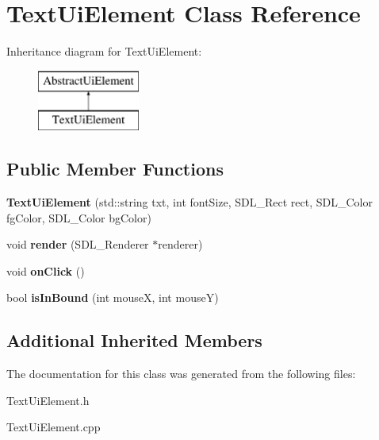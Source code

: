 \hypertarget{class_text_ui_element}{}\section{Text\+Ui\+Element Class Reference}
\label{class_text_ui_element}
Inheritance diagram for Text\+Ui\+Element\+:\begin{figure}[H]
\begin{center}
\leavevmode
\includegraphics[height=2.000000cm]{class_text_ui_element}
\end{center}
\end{figure}
\subsection*{Public Member Functions}
\begin{DoxyCompactItemize}
\item 
\mbox{\label{class_text_ui_element_a9386fa02eac98da9c8f71b6e2b2a88fb}} 
{\bfseries Text\+Ui\+Element} (std\+::string txt, int font\+Size, S\+D\+L\+\_\+\+Rect rect, S\+D\+L\+\_\+\+Color fg\+Color, S\+D\+L\+\_\+\+Color bg\+Color)
\item 
\mbox{\label{class_text_ui_element_a7931ba283acdf102442a9181b3ddf276}} 
void {\bfseries render} (S\+D\+L\+\_\+\+Renderer $\ast$renderer)
\item 
\mbox{\label{class_text_ui_element_a984d8bcd627f43c1bd858a707df2c042}} 
void {\bfseries on\+Click} ()
\item 
\mbox{\label{class_text_ui_element_aaf04a9d0a67e77e2ba2a306e1ec7aeed}} 
bool {\bfseries is\+In\+Bound} (int mouseX, int mouseY)
\end{DoxyCompactItemize}
\subsection*{Additional Inherited Members}


The documentation for this class was generated from the following files\+:\begin{DoxyCompactItemize}
\item 
Text\+Ui\+Element.\+h\item 
Text\+Ui\+Element.\+cpp\end{DoxyCompactItemize}
